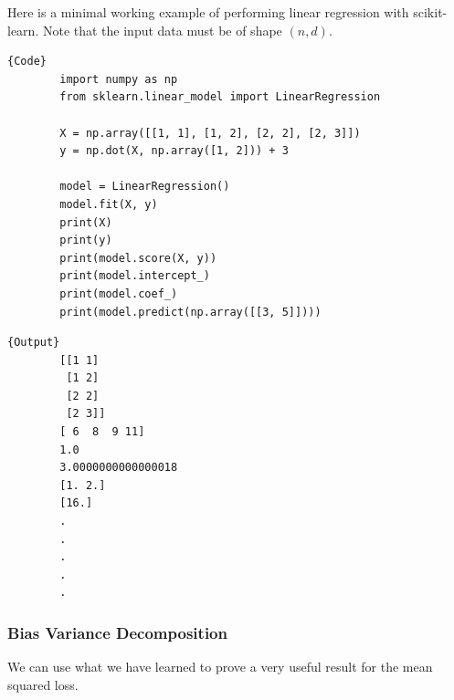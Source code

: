 \documentclass{article}
\begin{document}
    \begin{code}
      Here is a minimal working example of performing linear regression with scikit-learn. Note that the input data must be of shape $(n, d)$. 

      \noindent\begin{minipage}{.6\textwidth}
      \begin{lstlisting}[]{Code}
        import numpy as np 
        from sklearn.linear_model import LinearRegression 

        X = np.array([[1, 1], [1, 2], [2, 2], [2, 3]]) 
        y = np.dot(X, np.array([1, 2])) + 3 

        model = LinearRegression()  
        model.fit(X, y) 
        print(X) 
        print(y)
        print(model.score(X, y))  
        print(model.intercept_)
        print(model.coef_) 
        print(model.predict(np.array([[3, 5]])))
      \end{lstlisting}
      \end{minipage}
      \hfill
      \begin{minipage}{.39\textwidth}
      \begin{lstlisting}[]{Output}
        [[1 1]
         [1 2]
         [2 2]
         [2 3]]
        [ 6  8  9 11]
        1.0
        3.0000000000000018
        [1. 2.]
        [16.]
        .
        .
        .
        .
        .
      \end{lstlisting}
      \end{minipage}
    \end{code}

    \subsubsection{Bias Variance Decomposition} 

      We can use what we have learned to prove a very useful result for the mean squared loss. 
\end{document}
